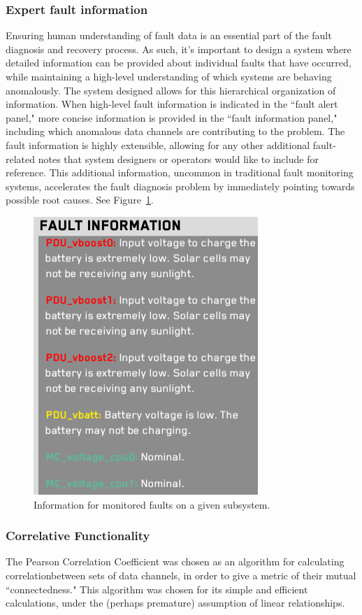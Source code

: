 \subsubsection{Expert fault information}

Ensuring human understanding of fault data is an essential part of the fault diagnosis and recovery process. As such, it's important to design a system where detailed information can be provided about individual faults that have occurred, while maintaining a high-level understanding of which systems are behaving anomalously. The system designed allows for this hierarchical organization of information. When high-level fault information is indicated in the ``fault alert panel," more concise information is provided in the ``fault information panel," including which anomalous data channels are contributing to the problem. The fault information is highly extensible, allowing for any other additional fault-related notes that system designers or operators would like to include for reference. This additional information, uncommon in traditional fault monitoring systems, accelerates the fault diagnosis problem by immediately pointing towards possible root causes. See Figure~\ref{fig:fault_info2}.

\begin{figure}[h]
\centering
    \includegraphics[width=0.4\columnwidth]{images/fault_info2.png}
    \caption{Information for monitored faults on a given subsystem.}
    \label{fig:fault_info2}
\end{figure}

\subsubsection{Correlative Functionality}

The Pearson Correlation Coefficient was chosen as an algorithm for calculating correlationbetween sets of data channels, in order to give a metric of their mutual ``connectedness." This algorithm was chosen for its simple and efficient calculations, under the (perhaps premature) assumption of linear relationships.

